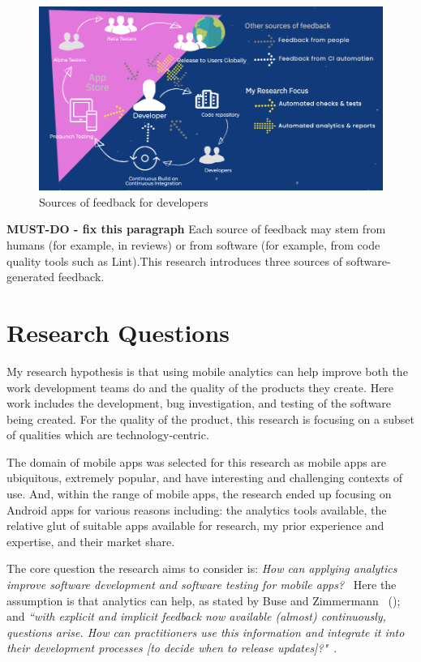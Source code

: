 \begin{figure}[htbp!]
    \centering
    \includegraphics[width=14cm]{images/silvias-developer-centric-figure-mobilesoft2020.png}
    \caption[Sources of feedback for developers]{Sources of feedback for developers \\}
    \label{fig:sources-of-feedback-for-developers}
\end{figure}

\textbf{MUST-DO - fix this paragraph} Each source of feedback may stem from humans (for example, in reviews) or from software (for example, from code quality tools such as Lint).This research introduces three sources of software-generated feedback.


\section{Research Questions}
\label{section-research-questions}

My research hypothesis is that using mobile analytics can help improve both the work development teams do and the quality of the products they create. Here work includes the development, bug investigation, and testing of the software being created. For the quality of the product, this research is focusing on a subset of qualities which are technology-centric.

The domain of mobile apps was selected for this research as mobile apps are ubiquitous, extremely popular, and have interesting and challenging contexts of use. And, within the range of mobile apps, the research ended up focusing on Android apps for various reasons including: the analytics tools available, the relative glut of suitable apps available for research, my prior experience and expertise, and their market share.

The core question the research aims to consider is: 
\emph{How can applying analytics improve software development and software testing for mobile apps?}~\label{overall-research-question}
Here the assumption is that analytics can help, as stated by Buse and Zimmermann ~(\citeyear{buse_analytics_2010}); and \emph{``with explicit and implicit feedback now available (almost) continuously, questions arise. How can practitioners use this information and integrate it into their development processes [to decide when to release updates]?"}~\citep{maalej2016_towards_data_driven_requirements_engineering}.

